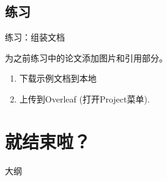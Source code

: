 \documentclass{beamer}
\begin{document}
\subsection{练习}
\begin{frame}[fragile]{练习：组装文档}

为之前练习中的论文添加图片和引用部分。

\begin{enumerate}
\item 下载示例文档到本地

\begin{center}

\end{center}

\item 上传到Overleaf (打开Project菜单).

\end{enumerate}
\end{frame}

\section{就结束啦？}

\begin{frame}{大纲}
\begin{multicols}{2}
\tableofcontents[currentsection]
\end{multicols}
\end{frame}

\end{document}
